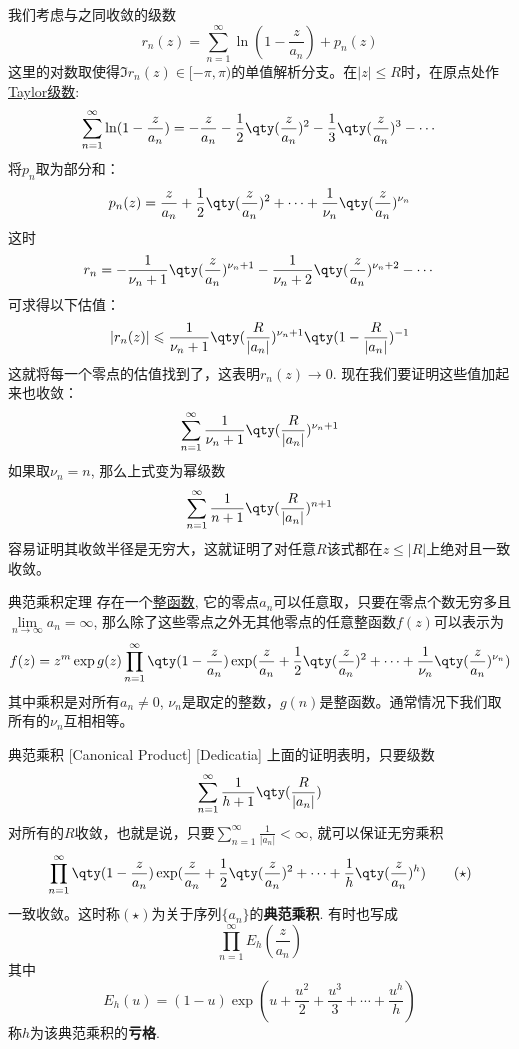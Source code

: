 \documentclass[UTF8]{ctexart}
\begin{document}
\begin{prf}
    我们考虑与之同收敛的级数
    \[r_n(z)=\sum_{n=1}^{\infty}\ln(1-\frac{z}{a_n})+p_n(z)\]
    这里的对数取使得$\Im r_n(z)\in[-\pi,\pi)$的单值解析分支。在$|z|\leqslant R$时，在原点处作\hyperref[thm:TaylorSeries]{Taylor级数}:
    \[\sum_{n=1}^{\infty}\ln(1-\frac{z}{a_n})=-\frac{z}{a_n}-\frac{1}{2}\qty(\frac{z}{a_n})^2-\frac{1}{3}\qty(\frac{z}{a_n})^3-\cdots\]
    将$p_n$取为部分和：
    \[p_n(z)=\frac{z}{a_n}+\frac{1}{2}\qty(\frac{z}{a_n})^2+\cdots+\frac{1}{\nu_n}\qty(\frac{z}{a_n})^{\nu_n}\]
    这时
    \[r_n=-\frac{1}{\nu_n+1}\qty(\frac{z}{a_n})^{\nu_n+1}-\frac{1}{\nu_n+2}\qty(\frac{z}{a_n})^{\nu_n+2}-\cdots\]
    可求得以下估值：
    \[|r_n(z)|\leqslant\frac{1}{\nu_n+1}\qty(\frac{R}{|a_n|})^{\nu_n+1}\qty(1-\frac{R}{|a_n|})^{-1} \]
    这就将每一个零点的估值找到了，这表明$r_n(z)\to 0$. 现在我们要证明这些值加起来也收敛：
    \[\sum_{n=1}^{\infty}\frac{1}{\nu_n+1}\qty(\frac{R}{|a_n|})^{\nu_n+1}\]
    如果取$\nu_n=n$, 那么上式变为幂级数
    \[\sum_{n=1}^{\infty}\frac{1}{n+1}\qty(\frac{R}{|a_n|})^{n+1}\]
    容易证明其收敛半径是无穷大，这就证明了对任意$R$该式都在$z\leq|R|$上绝对且一致收敛。
\end{prf}
\begin{thm}
    {典范乘积定理}
    存在一个\hyperref[dfn:EntireFunction]{整函数}, 它的零点$a_n$可以任意取，只要在零点个数无穷多且$\lim\limits_{n\to\infty }a_n=\infty$, 那么除了这些零点之外无其他零点的任意整函数$f(z)$可以表示为
    \[f(z)=z^m\exp g(z)\prod_{n=1}^{\infty}\qty(1-\frac{z}{a_n})\exp(\frac{z}{a_n}+\frac{1}{2}\qty(\frac{z}{a_n})^2+\cdots+\frac{1}{\nu_n}\qty(\frac{z}{a_n})^{\nu_n})\]
    其中乘积是对所有$a_n\neq 0$, $\nu_n$是取定的整数，$g(n)$是整函数。通常情况下我们取所有的$\nu_n$互相相等。
\end{thm}
\begin{dfn}
    [CanonicalProduct]
    {典范乘积}
    [Canonical Product]
    [Dedicatia]
    上面的证明表明，只要级数
    \[\sum_{n=1}^{\infty}\frac{1}{h+1}\qty(\frac{R}{|a_n|})\]
    对所有的$R$收敛，也就是说，只要$\sum\limits_{n=1}^{\infty}\frac{1}{|a_n|}<\infty$, 就可以保证无穷乘积
    \[\prod_{n=1}^{\infty}\qty(1-\frac{z}{a_n})\exp(\frac{z}{a_n}+\frac{1}{2}\qty(\frac{z}{a_n})^2+\cdots+\frac{1}{h}\qty(\frac{z}{a_n})^{h})\tag{$\star$}\]
    一致收敛。这时称$(\star)$为关于序列$\{a_n\}$的\textbf{典范乘积}. 有时也写成
    \[\prod_{n=1}^{\infty}E_h(\frac{z}{a_n})\]
    其中
    \[E_h(u)=(1-u)\exp(u+\frac{u^2}{2}+\frac{u^3}{3}+\cdots+\frac{u^h}{h})\]
    称$h$为该典范乘积的\textbf{亏格}.
\end{dfn}
\end{document}
